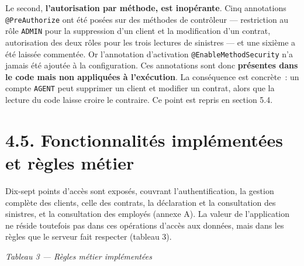 \documentclass[12pt,a4paper]{report}
\begin{document}
Le second, \textbf{l'autorisation par méthode, est inopérante}. Cinq annotations \texttt{@PreAuthorize} ont été posées sur des méthodes de contrôleur — restriction au rôle \texttt{ADMIN} pour la suppression d'un client et la modification d'un contrat, autorisation des deux rôles pour les trois lectures de sinistres — et une sixième a été laissée commentée. Or l'annotation d'activation \texttt{@EnableMethodSecurity} n'a jamais été ajoutée à la configuration. Ces annotations sont donc \textbf{présentes dans le code mais non appliquées à l'exécution}. La conséquence est concrète~: un compte \texttt{AGENT} peut supprimer un client et modifier un contrat, alors que la lecture du code laisse croire le contraire. Ce point est repris en section 5.4.
\section*{4.5. Fonctionnalités implémentées et règles métier}
Dix-sept points d'accès sont exposés, couvrant l'authentification, la gestion complète des clients, celle des contrats, la déclaration et la consultation des sinistres, et la consultation des employés (annexe A). La valeur de l'application ne réside toutefois pas dans ces opérations d'accès aux données, mais dans les règles que le serveur fait respecter (tableau 3).
\begin{center}\textit{Tableau 3 — Règles métier implémentées}\end{center}
\end{document}
